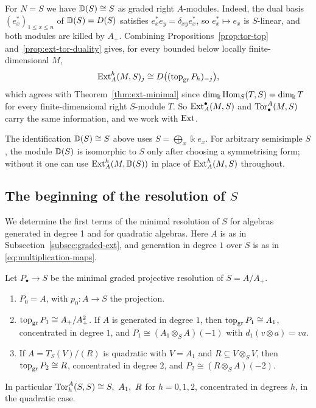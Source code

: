 For $N=S$ we have $\mathbb{D}(S)\cong S$ as graded right $A$-modules.
Indeed, the dual basis $(e_x^*)_{1\leq x\leq n}$ of $\mathbb{D}(S)=D(S)$ satisfies $e_x^*e_y=\delta_{xy}e_x^*$, so $e_x^*\mapsto e_x$ is $S$-linear, and both modules are killed by $A_+$.
Combining Propositions~\ref{prop:tor-top} and~\ref{prop:ext-tor-duality} gives, for every bounded below locally finite-dimensional $M$,
\[
\operatorname{Ext}\nolimits_A^h(M,S)_j\cong D\bigl((\operatorname{top}\nolimits_{\mathrm{gr}} P_h)_{-j}\bigr),
\]
which agrees with Theorem~\ref{thm:ext-minimal} since $\dim_\Bbbk\operatorname{Hom}\nolimits_S(T,S)=\dim_\Bbbk T$ for every finite-dimensional right $S$-module $T$.
So $\operatorname{Ext}\nolimits_A^\bullet(M,S)$ and $\operatorname{Tor}\nolimits_\bullet^A(M,S)$ carry the same information, and we work with $\operatorname{Ext}\nolimits$.

\begin{remark}[General $S$]\label{rem:tor-general-S}
The identification $\mathbb{D}(S)\cong S$ above uses $S=\bigoplus_x\Bbbk e_x$.
For arbitrary semisimple $S$, the module $\mathbb{D}(S)$ is isomorphic to $S$ only after choosing a symmetrising form; without it one can use $\operatorname{Ext}\nolimits_A^h(M,\mathbb{D}(S))$ in place of $\operatorname{Ext}\nolimits_A^h(M,S)$ throughout.
\end{remark}

\subsection{The beginning of the resolution of $S$}

We determine the first terms of the minimal resolution of $S$ for algebras generated in degree 1 and for quadratic algebras.
Here $A$ is as in Subsection~\ref{subsec:graded-ext}, and generation in degree $1$ over $S$ is as in \eqref{eq:multiplication-maps}.

\begin{proposition}\label{prop:resolution-first-terms}
Let $P_\bullet\to S$ be the minimal graded projective resolution of $S=A/A_+$.
\begin{enumerate}
\item $P_0=A$, with $p_0:A\to S$ the projection.
\item $\operatorname{top}\nolimits_{\mathrm{gr}} P_1\cong A_+/A_+^2$.
If $A$ is generated in degree $1$, then $\operatorname{top}\nolimits_{\mathrm{gr}} P_1\cong A_1$, concentrated in degree $1$, and $P_1\cong(A_1\otimes_SA)(-1)$ with $d_1(v\otimes a)=va$.
\item If $A=T_S(V)/(R)$ is quadratic with $V=A_1$ and $R\subseteq V\otimes_SV$, then $\operatorname{top}\nolimits_{\mathrm{gr}} P_2\cong R$, concentrated in degree $2$, and $P_2\cong(R\otimes_SA)(-2)$.
\end{enumerate}
In particular $\Tor_h^A(S,S)\cong S,\ A_1,\ R$ for $h=0,1,2$, concentrated in degrees $h$, in the quadratic case.
\end{proposition}

